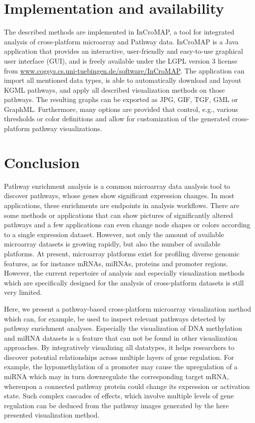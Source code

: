 \documentclass{bioinfo}
\begin{document}
\section{Implementation and availability}
The described methods are implemented in InCroMAP, a tool for integrated analysis of cross-platform microarray and Pathway data. 
InCroMAP is a Java\texttrademark{} application that provides an interactive, user-friendly and easy-to-use graphical user interface (GUI), and is freely available under the LGPL version 3 license from \href{http://www.cogsys.cs.uni-tuebingen.de/software/InCroMAP/}{www.cogsys.cs.uni-tuebingen.de/software/InCroMAP}. The application can import all mentioned data types, is able to automatically download and layout KGML pathways, and apply all described visualization methods on those pathways. The resulting graphs can be exported as JPG, GIF, TGF, GML or GraphML. Furthermore, many options are provided that control, e.g., various thresholds or color definitions and allow for customization of the generated cross-platform pathway visualizations.


\section{Conclusion}

Pathway enrichment analysis is a common microarray data analysis tool to discover pathways, whose
genes show significant expression changes. In most applications, these enrichments are endpoints in
analysis workflows. There are some methods or applications that can show pictures of significantly
altered pathways and a few applications can even change node shapes or colors according to a single
expression dataset. However, not only the amount of available microarray datasets is growing
rapidly, but also the number of available platforms. At present, microarray platforms exist for
profiling diverse genomic features, as for instance mRNAs, miRNAs, proteins and promoter regions.
However, the current repertoire of analysis and especially visualization methods which are specifically designed for
the analysis of cross-platform datasets is still very limited.

Here, we present a pathway-based cross-platform microarray visualization method which
can, for example, be used to inspect relevant pathways detected by pathway enrichment analyses. Especially the
visualization of DNA methylation and miRNA datasets is a feature that can not be found in other
visualization approaches. By integratively visualizing all datatypes, it helps researchers to
discover potential relationships across multiple layers of gene regulation.
For example, the hypomethylation of a promoter may cause the upregulation of a miRNA which may in turn
downregulate the corresponding target mRNA, whereupon a connected pathway protein could change its expression or activation state.
Such complex cascades of effects, which involve multiple levels of gene regulation can be deduced from the pathway images
generated by the here presented visualization method.
\end{document}
